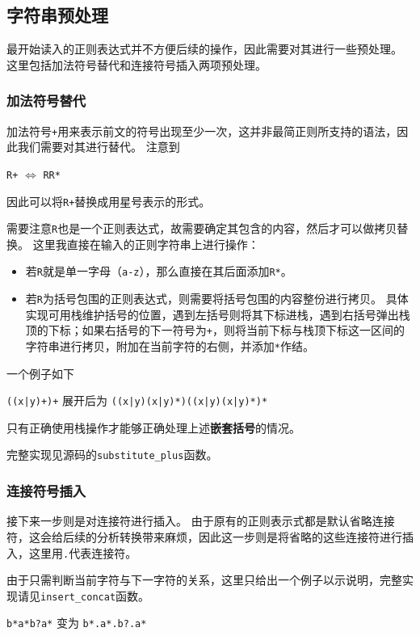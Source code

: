 \documentclass[logo,reportComp]{thesis}
\begin{document}
\subsection{字符串预处理}
最开始读入的正则表达式并不方便后续的操作，因此需要对其进行一些预处理。
这里包括加法符号替代和连接符号插入两项预处理。

\subsubsection{加法符号替代}
加法符号\verb'+'用来表示前文的符号出现至少一次，这并非最简正则所支持的语法，因此我们需要对其进行替代。
注意到
\begin{center}
\verb'R+' $\iff$ \verb'RR*'
\end{center}
因此可以将\verb'R+'替换成用星号表示的形式。

需要注意\verb'R'也是一个正则表达式，故需要确定其包含的内容，然后才可以做拷贝替换。
这里我直接在输入的正则字符串上进行操作：
\begin{itemize}
	\item 若\verb'R'就是单一字母（\verb'a-z'），那么直接在其后面添加\verb'R*'。
	\item 若\verb'R'为括号包围的正则表达式，则需要将括号包围的内容整份进行拷贝。
	具体实现可用栈维护括号的位置，遇到左括号则将其下标进栈，遇到右括号弹出栈顶的下标；如果右括号的下一符号为\verb'+'，则将当前下标与栈顶下标这一区间的字符串进行拷贝，附加在当前字符的右侧，并添加\verb'*'作结。
\end{itemize}

一个例子如下
\begin{center}
\verb'((x|y)+)+' 展开后为 \verb'((x|y)(x|y)*)((x|y)(x|y)*)*'
\end{center}
只有正确使用栈操作才能够正确处理上述\textbf{嵌套括号}的情况。

完整实现见源码的\verb'substitute_plus'函数。

\subsubsection{连接符号插入}
接下来一步则是对连接符进行插入。
由于原有的正则表示式都是默认省略连接符，这会给后续的分析转换带来麻烦，因此这一步则是将省略的这些连接符进行插入，这里用\verb'.'代表连接符。

由于只需判断当前字符与下一字符的关系，这里只给出一个例子以示说明，完整实现请见\verb'insert_concat'函数。
\begin{center}
\verb'b*a*b?a*' 变为 \verb'b*.a*.b?.a*'
\end{center}
\end{document}
